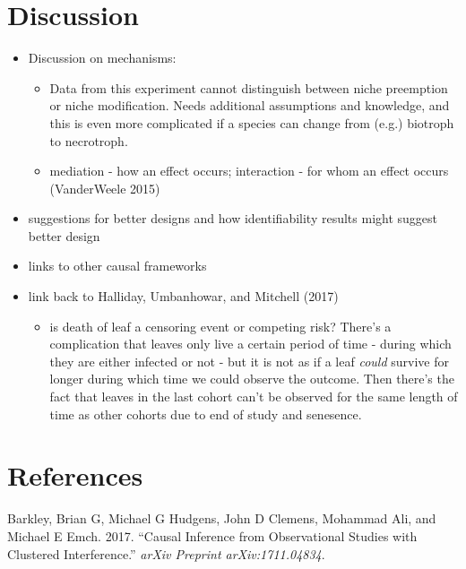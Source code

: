 \documentclass[]{article}
\providecommand{\tightlist}{%
  \setlength{\itemsep}{0pt}\setlength{\parskip}{0pt}}
\begin{document}
\hypertarget{discussion}{%
\section{Discussion}\label{discussion}}

\begin{itemize}
\tightlist
\item
  Discussion on mechanisms:

  \begin{itemize}
  \tightlist
  \item
    Data from this experiment cannot distinguish between niche
    preemption or niche modification. Needs additional assumptions and
    knowledge, and this is even more complicated if a species can change
    from (e.g.) biotroph to necrotroph.
  \item
    mediation - how an effect occurs; interaction - for whom an effect
    occurs (VanderWeele 2015)
  \end{itemize}
\item
  suggestions for better designs and how identifiability results might
  suggest better design
\item
  links to other causal frameworks
\item
  link back to Halliday, Umbanhowar, and Mitchell (2017)

  \begin{itemize}
  \tightlist
  \item
    is death of leaf a censoring event or competing risk? There's a
    complication that leaves only live a certain period of time - during
    which they are either infected or not - but it is not as if a leaf
    \emph{could} survive for longer during which time we could observe
    the outcome. Then there's the fact that leaves in the last cohort
    can't be observed for the same length of time as other cohorts due
    to end of study and senesence.
  \end{itemize}
\end{itemize}

\hypertarget{references}{%
\section*{References}\label{references}}

\hypertarget{refs}{}
\leavevmode\hypertarget{ref-barkley2017causal}{}%
Barkley, Brian G, Michael G Hudgens, John D Clemens, Mohammad Ali, and
Michael E Emch. 2017. ``Causal Inference from Observational Studies with
Clustered Interference.'' \emph{arXiv Preprint arXiv:1711.04834}.
\end{document}
